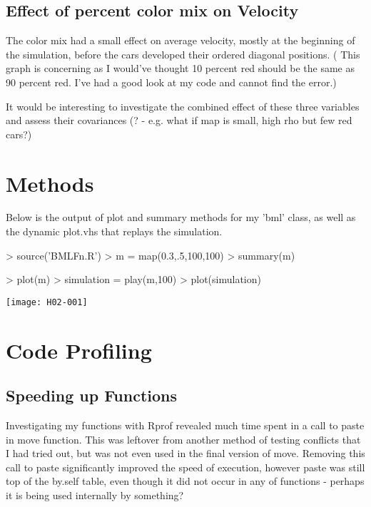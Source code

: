 \documentclass[12pt]{article}
\begin{document}
		\subsection{Effect of percent color mix on Velocity}
			The color mix had a small effect on average velocity, mostly at the beginning of the simulation, before the cars developed their ordered diagonal positions. ( This graph is concerning as I would've thought 10 percent red should be the same as 90 percent red. I've had a good look at my code and cannot find the error.)

			It would be interesting to investigate the combined effect of these three variables and assess their covariances (? - e.g. what if map is small, high rho but few red cars?)
			
	\clearpage
	\section{Methods}
		Below is the output of plot and summary methods for my 'bml' class, as well as the dynamic plot.vhs that replays the simulation.
\begin{Schunk}
\begin{Sinput}
> source('BMLFn.R')
> m = map(0.3,.5,100,100)
> summary(m)
\end{Sinput}
\begin{Sinput}
> plot(m)
> simulation = play(m,100)
> plot(simulation)
\end{Sinput}
\end{Schunk}
\texttt{[image: H02-001]}
\clearpage

	\section{Code Profiling}
		\subsection{Speeding up Functions}
		Investigating my functions with Rprof revealed much time spent in a call to paste in move function. This was leftover from another method of testing conflicts that I had tried out, but was not even used in the final version of move. Removing this call to paste significantly improved the speed of execution, however paste was still top of the by.self table, even though it did not occur in any of functions - perhaps it is being used internally by something?
\end{document}

